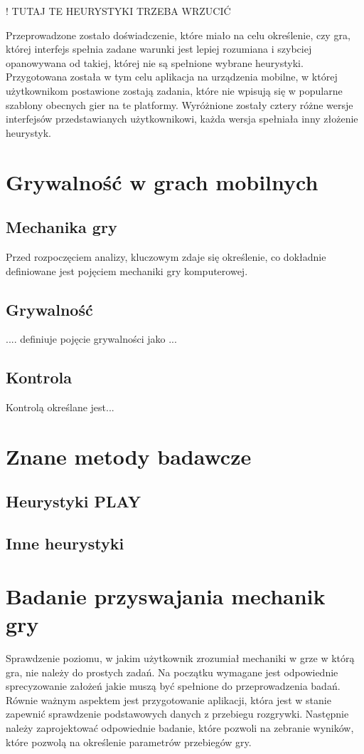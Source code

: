 \documentclass[a4paper,12pt,numbers=noenddot]{report}
\begin{document}
! TUTAJ TE HEURYSTYKI TRZEBA WRZUCIĆ

Przeprowadzone zostało doświadczenie, które miało na celu określenie, czy gra, której interfejs spełnia zadane warunki jest lepiej rozumiana i szybciej opanowywana od takiej, której nie są spełnione wybrane heurystyki. Przygotowana została w tym celu aplikacja na urządzenia mobilne, w której użytkownikom postawione zostają zadania, które nie wpisują się w popularne szablony obecnych gier na te platformy. Wyróżnione zostały cztery różne wersje interfejsów przedstawianych użytkownikowi, każda wersja spełniała inny złożenie heurystyk.

\chapter{Grywalność w grach mobilnych}

\section{Mechanika gry}
Przed rozpoczęciem analizy, kluczowym zdaje się określenie, co dokładnie definiowane jest pojęciem mechaniki gry komputerowej. 
\section{Grywalność}
 .... definiuje pojęcie grywalności jako ...

\section{Kontrola}
Kontrolą określane jest...

\chapter{Znane metody badawcze}

\section{Heurystyki PLAY}

\section{Inne heurystyki}

\chapter{Badanie przyswajania mechanik gry}
Sprawdzenie poziomu, w jakim użytkownik zrozumiał mechaniki w grze w którą gra, nie należy do prostych zadań. Na początku wymagane jest odpowiednie sprecyzowanie założeń jakie muszą być spełnione do przeprowadzenia badań. Równie ważnym aspektem jest przygotowanie aplikacji, która jest w stanie zapewnić sprawdzenie podstawowych danych z przebiegu rozgrywki. Następnie należy zaprojektować odpowiednie badanie, które pozwoli na zebranie wyników, które pozwolą na określenie parametrów przebiegów gry.
\end{document}
